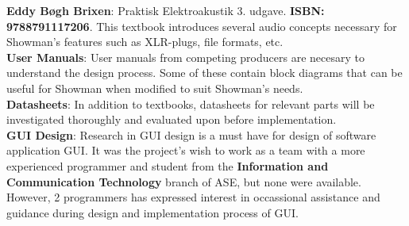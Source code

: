 \textbf{Eddy Bøgh Brixen}: Praktisk Elektroakustik 3. udgave. \textbf{ISBN: 9788791117206}. This textbook introduces several audio concepts necessary for Showman's features such as XLR-plugs, file formats, etc. \\ 

\textbf{User Manuals}: User manuals from competing producers are necesary to understand the design process. Some of these contain block diagrams that can be useful for Showman when modified to suit Showman's needs. \\

\textbf{Datasheets}: In addition to textbooks, datasheets for relevant parts will be investigated thoroughly and evaluated upon before implementation. \\

\textbf{GUI Design}: Research in GUI design is a must have for design of software application GUI. It was the project's wish to work as a team with a more experienced programmer and student from the \textbf{Information and Communication Technology} branch of ASE, but none were available. However, 2 programmers has expressed interest in occassional assistance and guidance during design and implementation process of GUI.